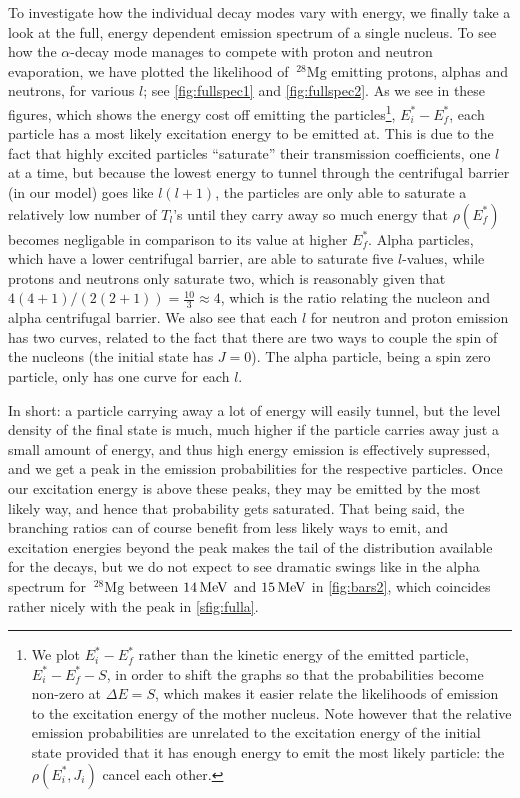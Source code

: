 To investigate how the individual decay modes vary with energy, we finally take a look at the full, energy dependent emission spectrum of a single nucleus.
To see how the $\alpha$-decay mode manages to compete with proton and neutron evaporation, we have plotted the likelihood of $~^{28}\mathrm{Mg}$ emitting protons, alphas and neutrons, for various $l$; see \autoref{fig:fullspec1} and \autoref{fig:fullspec2}. As we see in these figures, which shows the energy cost off emitting the particles\footnote{We plot $E_i^*-E_f^*$ rather than the kinetic energy of the emitted particle, $E_i^*-E_f^*-S$, in order to shift the graphs so that the probabilities become non-zero at $\Delta E = S$, which makes it easier relate the likelihoods of emission to the excitation energy of the mother nucleus. Note however that the relative emission probabilities are unrelated to the excitation energy of the initial state provided that it has enough energy to emit the most likely particle: the $\rho(E_i^*,J_i)$ cancel each other.}, $E_i^*-E_f^*$, each particle has a most likely excitation energy to be emitted at. This is due to the fact that highly excited particles ``saturate'' their transmission coefficients, one $l$ at a time, but because the lowest energy to tunnel through the centrifugal barrier (in our model) goes like $l(l+1)$, the particles are only able to saturate a relatively low number of $T_l$'s until they carry away so much energy that $\rho(E_f^*)$ becomes negligable in comparison to its value at higher $E_f^*$. 
Alpha particles, which have a lower centrifugal barrier, are able to saturate five $l$-values, while protons and neutrons only saturate two, which is reasonably given that $4(4+1)/(2(2+1)) = \frac{10}{3} \approx 4$, which is the ratio relating the nucleon and alpha centrifugal barrier. 
We also see that each $l$ for neutron and proton emission has two curves, related to the fact that there are two ways to couple the spin of the nucleons (the initial state has $J=0$). The alpha particle, being a spin zero particle, only has one curve for each $l$.

In short: a particle carrying away a lot of energy will easily tunnel, but the level density of the final state is much, much higher if the particle carries away just a small amount of energy, and thus high energy emission is effectively supressed, and we get a peak in the emission probabilities for the respective particles. Once our excitation energy is above these peaks, they may be emitted by the most likely way, and hence that probability gets saturated. That being said, the branching ratios can of course benefit from less likely ways to emit, and excitation energies beyond the peak makes the tail of the distribution available for the decays, but we do not expect to see dramatic swings like in the alpha spectrum for $~^{28}\mathrm{Mg}$ between $\unit[14]{MeV}$ and $\unit[15]{MeV}$ in \autoref{fig:bars2}, which coincides rather nicely with the peak in \autoref{sfig:fulla}.


